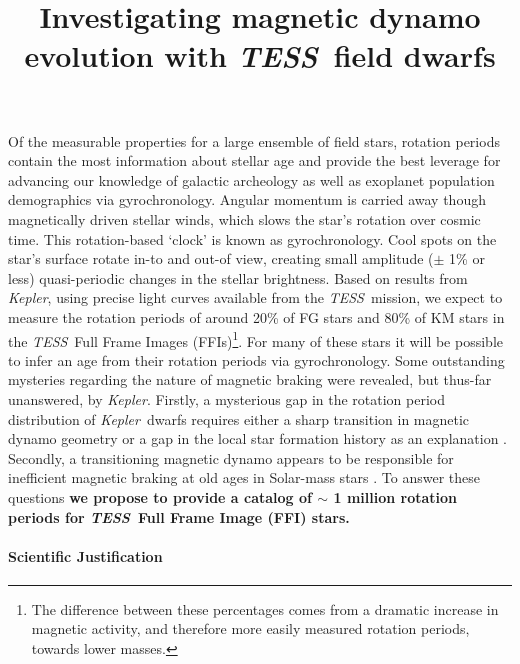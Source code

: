 \documentclass[letterpaper,12pt,preprint]{hack_aastex}
\newcommand{\Kepler}{{\it Kepler}}
\newcommand{\kepler}{\Kepler}
\newcommand{\TESS}{{\it TESS}}
\newcommand{\tess}{{\it TESS}}
\begin{document}
\title{Investigating magnetic dynamo evolution with \TESS\ field dwarfs}

Of the measurable properties for a large ensemble of field stars, rotation
periods contain the most information about stellar age and provide the best
leverage for advancing our knowledge of galactic archeology as well as
exoplanet population demographics via gyrochronology.
Angular momentum is carried away though magnetically driven stellar winds,
which slows the star's rotation over cosmic time.
This rotation-based `clock' is known as gyrochronology.
Cool spots on the star's surface rotate in-to and out-of view, creating small
amplitude ($\pm$ 1\% or less) quasi-periodic changes in the stellar
brightness.
Based on results from \Kepler, using precise light curves available from the
\TESS\ mission, we expect to measure the rotation periods of around 20\% of FG
stars and 80\% of KM stars in the \tess\ Full Frame Images (FFIs)\footnote{The
difference between these percentages comes from a dramatic increase in
magnetic activity, and therefore more easily measured rotation periods,
towards lower masses.}.
For many of these stars it will be possible to infer an age from their
rotation periods via gyrochronology.
Some outstanding mysteries regarding the nature of magnetic braking were
revealed, but thus-far unanswered, by \kepler.
Firstly, a mysterious gap in the rotation period distribution of \Kepler\
dwarfs requires either a sharp transition in magnetic dynamo geometry or a gap
in the local star formation history as an explanation \citep{mcquillan2014,
davenport2017}.
Secondly, a transitioning magnetic dynamo appears to be responsible for
inefficient magnetic braking at old ages in Solar-mass stars
\citep{van-saders2016}.
To answer these questions {\bf we propose to provide a catalog of $\sim$ 1
million rotation periods for \TESS\ Full Frame Image (FFI) stars.}

\paragraph{Scientific Justification}
\end{document}
